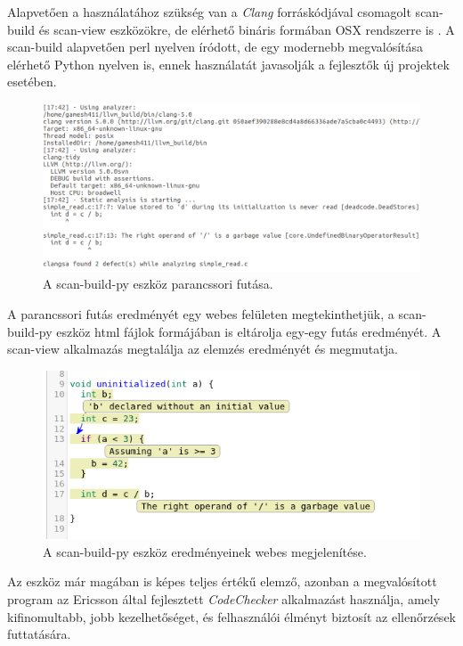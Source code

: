 \documentclass[a4paper,12pt]{report}
\begin{document}
Alapvetően a használatához szükség van a \emph{Clang} forráskódjával csomagolt scan-build és scan-view eszközökre, de elérhető bináris formában OSX rendszerre is \cite{clangsahomepage}. A scan-build alapvetően perl nyelven íródott, de egy modernebb megvalósítása elérhető Python nyelven is, ennek használatát javasolják a fejlesztők új projektek esetében.

\begin{figure}[h]
\caption{A scan-build-py eszköz parancssori futása.}
\centering
\includegraphics[scale=0.4]{uninit_commandline.png}
\end{figure}

A parancssori futás eredményét egy webes felületen megtekinthetjük, a scan-build-py eszköz html fájlok formájában is eltárolja egy-egy futás eredményét. A scan-view alkalmazás megtalálja az elemzés eredményét és megmutatja.

\begin{figure}[h]
\caption{A scan-build-py eszköz eredményeinek webes megjelenítése.}
\centering
\includegraphics[scale=0.8]{uninit_web.png}
\end{figure}

Az eszköz már magában is képes teljes értékű elemző, azonban a megvalósított program az Ericsson által fejlesztett \emph{CodeChecker} \cite{codecheckergit} alkalmazást használja, amely kifinomultabb, jobb kezelhetőséget, és felhasználói élményt biztosít az ellenőrzések futtatására.
\end{document}
